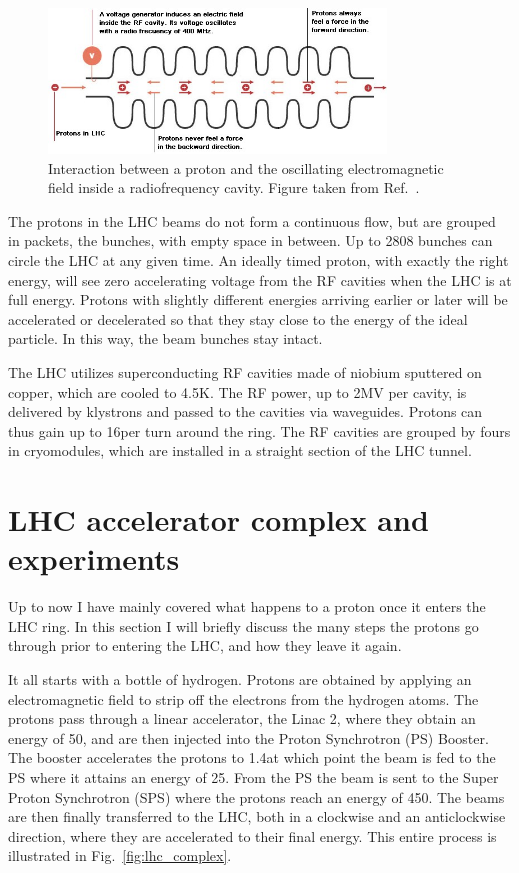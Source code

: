 \begin{figure}[htpb]
  \centering
  \includegraphics[width=0.8\textwidth]{figures/lhc/RF_explanation}
  \caption{Interaction between a proton and the oscillating electromagnetic field inside a
radiofrequency cavity. Figure taken from Ref.~\cite{RF_explanation}.
  \label{fig:RF_explanation}}
\end{figure}

The protons in the LHC beams do not form a continuous flow, but are grouped in packets, the bunches,
with empty space in between. Up to 2808 bunches can circle the LHC at any
given time. An ideally timed proton, with exactly the right energy, will see zero
accelerating voltage from the RF cavities when the LHC is at full energy. Protons with slightly
different energies arriving earlier or later will be accelerated or decelerated so that they stay
close to the energy of the ideal particle. In this way, the beam bunches stay intact. 

The LHC utilizes superconducting RF cavities made of niobium sputtered on copper, which are
cooled to 4.5\unit{K}. The RF power, up to 2\unit{MV} per cavity, is delivered by klystrons and
passed to the cavities via waveguides. Protons can thus gain up to 16\MeV per turn around the ring.
The RF cavities are grouped by fours in cryomodules, which are installed in a straight section of
the LHC tunnel. 

\section{LHC accelerator complex and experiments}

Up to now I have mainly covered what happens to a proton once it enters the LHC ring. In this
section I will briefly discuss the many steps the protons go through prior to entering the LHC,
and how they leave it again. 

It all starts with a bottle of hydrogen. Protons are obtained by applying an electromagnetic field
to strip off the electrons from the hydrogen atoms. The protons pass through a linear accelerator,
the Linac 2, where they obtain an energy of 50\MeV, and are then injected into the Proton
Synchrotron (PS) Booster. The booster accelerates the protons to 1.4\GeV at which point the beam is
fed to the PS where it attains an energy of 25\GeV. From the PS the beam is sent to the Super Proton
Synchrotron (SPS) where the protons reach an energy of 450\GeV. 
The beams are then finally transferred to the LHC, both in a clockwise and an anticlockwise
direction, where they are accelerated to their final energy. This entire process is illustrated in
Fig.~\ref{fig:lhc_complex}. 

